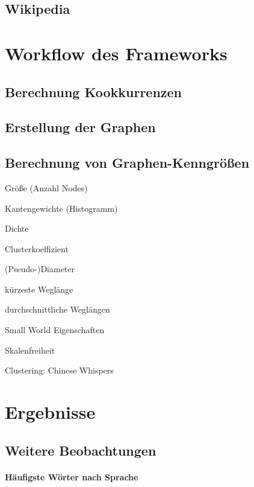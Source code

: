 \documentclass[12pt]{article}
\begin{document}
\subsection{Wikipedia}



\section{Workflow des Frameworks}

\subsection{Berechnung Kookkurrenzen}

\subsection{Erstellung der Graphen}

\subsection{Berechnung von Graphen-Kenngr\"o\ss{}en}

Gr\"o\ss{}e (Anzahl Nodes)

Kantengewichte (Histogramm)

Dichte

Clusterkoeffizient

(Pseudo-)Diameter

kürzeste Wegl\"ange

durchschnittliche Wegl\"angen

Small World Eigenschaften

Skalenfreiheit

Clustering: Chinese Whispers



\section{Ergebnisse}

\subsection{Weitere Beobachtungen}

\paragraph{H\"aufigste W\"orter nach Sprache}
\end{document}
